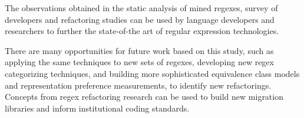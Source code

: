 The observations obtained in the static analysis of mined regexes, survey of developers and refactoring studies can be used by language developers and researchers to further the state-of-the art of regular expression technologies.

There are many opportunities for future work based on this study, such as applying the same techniques to new sets of regexes, developing new regex categorizing techniques, and building more sophisticated equivalence class models and representation preference measurements, to identify new refactorings.  Concepts from regex refactoring research can be used to build new migration libraries and inform institutional coding standards.

